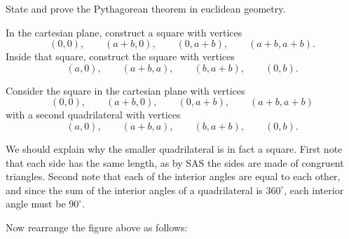 \documentclass[newpage,hints,handout,noauthor,nooutcomes,12pt]{ximera}
\begin{document}
\begin{problem}
State and prove the Pythagorean theorem in euclidean geometry.

\begin{hint}
In the cartesian plane, construct a square with vertices
\[
\left(0,0\right),\qquad \left(a+b,0\right),\qquad \left(0,a+b\right), \qquad \left( a+b,a+b\right).
\] 
Inside that square, construct the square with vertices 
\[
\left(a,0\right),\qquad \left(a+b,a\right),\qquad \left(b,a+b\right), \qquad \left(0,b\right).
\]
\end{hint}
\begin{freeResponse}
Consider the square in the cartesian plane with vertices
\[
\left(0,0\right),\qquad \left(a+b,0\right),\qquad \left(0,a+b\right),
\qquad \left( a+b,a+b\right)
\]
with a second quadrilateral with vertices
\[
\left(a,0\right),\qquad \left(a+b,a\right),\qquad \left(b,a+b\right), \qquad \left(0,b\right).
\]
\begin{image}
\end{image}
We should explain why the smaller quadrilateral is in fact a
square. First note that each side has the same length, as by SAS the
sides are made of congruent triangles. Second note that each of the
interior angles are equal to each other, and since the sum of the
interior angles of a quadrilateral is $360^\circ$, each interior angle
must be $90^\circ$.

Now rearrange the figure above as follows:
\begin{image}
\end{image}
\end{freeResponse}
\end{problem}
\end{document}
